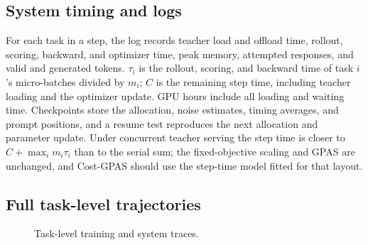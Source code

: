 \subsection{System timing and logs}
\label{app:system_details}

For each task in a step, the log records teacher load and offload time,
rollout, scoring, backward, and optimizer time, peak memory, attempted
responses, and valid and generated tokens. $\tau_i$ is the rollout, scoring,
and backward time of task $i$'s micro-batches divided by $m_i$; $C$ is the
remaining step time, including teacher loading and the optimizer update.
GPU hours include all loading and waiting time. Checkpoints store the
allocation, noise estimates, timing averages, and prompt positions, and a
resume test reproduces the next allocation and parameter update. Under
concurrent teacher serving the step time is closer to $C+\max_i m_i\tau_i$
than to the serial sum; the fixed-objective scaling and GPAS are unchanged,
and Cost-GPAS should use the step-time model fitted for that layout.

\subsection{Full task-level trajectories}

\begin{figure}[H]
    \centering
    \caption{Task-level training and system traces.
    }
    \label{fig:appendix_task_curves}
\end{figure}
